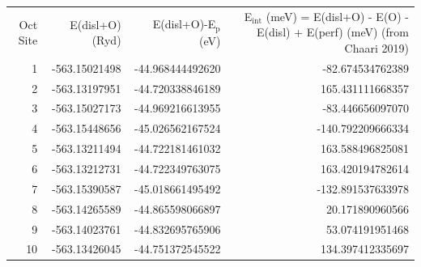 \documentclass[11pt]{article}
\begin{document}
\begin{center}
\begin{tabular}{rrrr}
Oct Site & E(disl+O)(Ryd) & E(disl+O)-E\(_{\text{p}}\) (eV) & E\(_{\text{int}}\) (meV) = E(disl+O) - E(O) - E(disl) + E(perf) (meV) (from Chaari 2019)\\
1 & -563.15021498 & -44.968444492620 & -82.674534762389\\
2 & -563.13197951 & -44.720338846189 & 165.431111668357\\
3 & -563.15027173 & -44.969216613955 & -83.446656097070\\
4 & -563.15448656 & -45.026562167524 & -140.792209666334\\
5 & -563.13211494 & -44.722181461032 & 163.588496825081\\
6 & -563.13212731 & -44.722349763075 & 163.420194782614\\
7 & -563.15390587 & -45.018661495492 & -132.891537633978\\
8 & -563.14265589 & -44.865598066897 & 20.171890960566\\
9 & -563.14023761 & -44.832695765906 & 53.074191951468\\
10 & -563.13426045 & -44.751372545522 & 134.397412335697\\
\end{tabular}
\end{center}
\end{document}
